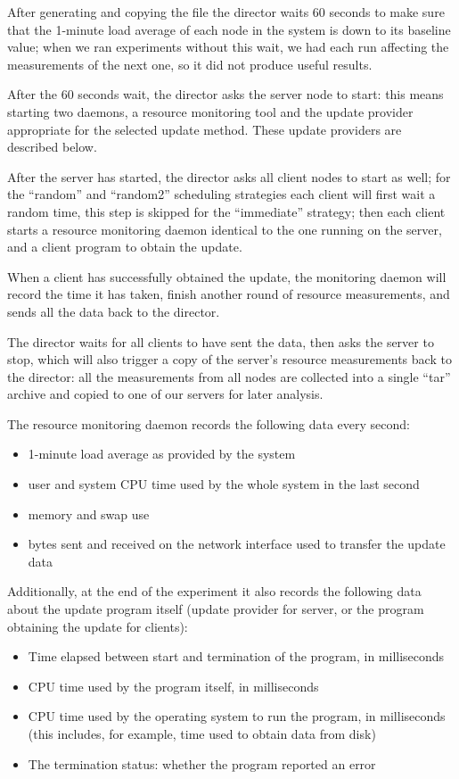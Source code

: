 \documentclass[a4paper,11pt,twocolumn]{article}
\begin{document}
After generating and copying the file the director waits 60 seconds to
make sure that the 1-minute load average of each node in the system is
down to its baseline value; when we ran experiments without this wait,
we had each run affecting the measurements of the next one, so it did
not produce useful results.

After the 60 seconds wait, the director asks the server node to start:
this means starting two daemons, a resource monitoring tool and the
update provider appropriate for the selected update method.  These
update providers are described below.

After the server has started, the director asks all client nodes to
start as well; for the ``random'' and ``random2'' scheduling strategies
each client will first wait a random time, this step is skipped
for the ``immediate'' strategy; then each client starts a resource
monitoring daemon identical to the one running on the server, and a client
program to obtain the update.

When a client has successfully obtained the update, the monitoring
daemon will record the time it has taken, finish another round of
resource measurements, and sends all the data back to the director.

The director waits for all clients to have sent the data, then asks the
server to stop, which will also trigger a copy of the server's resource
measurements back to the director: all the measurements from all nodes
are collected into a single ``tar'' archive and copied to one of our
servers for later analysis.

The resource monitoring daemon records the following data every second:

\begin{itemize}
\item 1-minute load average as provided by the system
\item user and system CPU time used by the whole system in the last second
\item memory and swap use
\item bytes sent and received on the network interface used to
transfer the update data
\end{itemize}

Additionally, at the end of the experiment it also records the following
data about the update program itself (update provider for server, or
the program obtaining the update for clients):

\begin{itemize}
\item Time elapsed between start and termination of the program, in milliseconds
\item CPU time used by the program itself, in milliseconds
\item CPU time used by the operating system to run the program, in milliseconds
(this includes, for example, time used to obtain data from disk)
\item The termination status: whether the program reported an error
\end{itemize}
\end{document}
